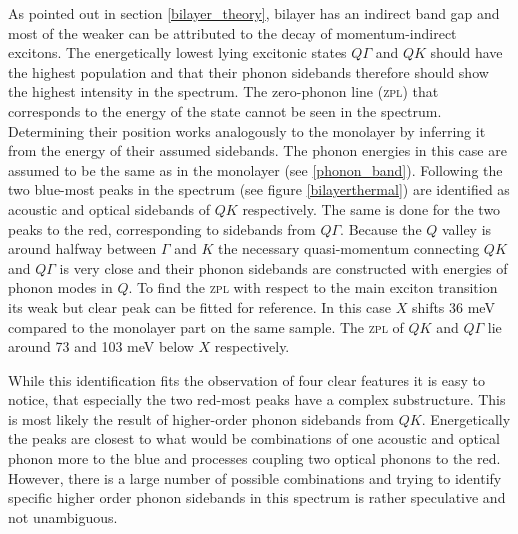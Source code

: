 As pointed out in section \ref{bilayer_theory}, bilayer \wse has an indirect band gap and most of the weaker \pl can be attributed to the decay of momentum-indirect excitons. The energetically lowest lying excitonic states $Q\Gamma$ and $QK$ should have the highest population and that their phonon sidebands therefore should show the highest intensity in the spectrum. The zero-phonon line (\textsc{zpl}) that corresponds to the energy of the state cannot be seen in the spectrum. Determining their position works analogously to the monolayer by inferring it from the energy of their assumed sidebands. The phonon energies in this case are assumed to be the same as in the monolayer (see \ref{phonon_band}). Following  \cite{lindlau_role_2017} the two blue-most peaks in the spectrum (see figure \ref{bilayerthermal}) are identified as  acoustic and optical sidebands of $QK$ respectively. The same is done for the two peaks to the red, corresponding to sidebands from $Q\Gamma$. Because the $Q$ valley is around halfway between $\Gamma$ and $K$ the necessary quasi-momentum connecting $QK$ and $Q\Gamma$ is very close and their phonon sidebands are constructed with energies of phonon modes in $Q$. To find the \textsc{zpl} with respect to the main exciton transition its weak but clear peak can be fitted for reference. In this case $X$ shifts 36 meV compared to the monolayer part on the same sample. The \textsc{zpl} of $QK$ and $Q\Gamma$ lie around 73 and 103 meV below $X$ respectively.

While this identification fits the observation of four clear features it is easy to notice, that especially the two red-most peaks have a complex substructure. This is most likely the result of higher-order phonon sidebands from $QK$. Energetically the peaks are closest to what would be combinations of one acoustic and optical phonon more to the blue and processes coupling two optical phonons to the red. However, there is a large number of possible combinations and trying to identify specific higher order phonon sidebands in this spectrum is rather speculative and not unambiguous.

